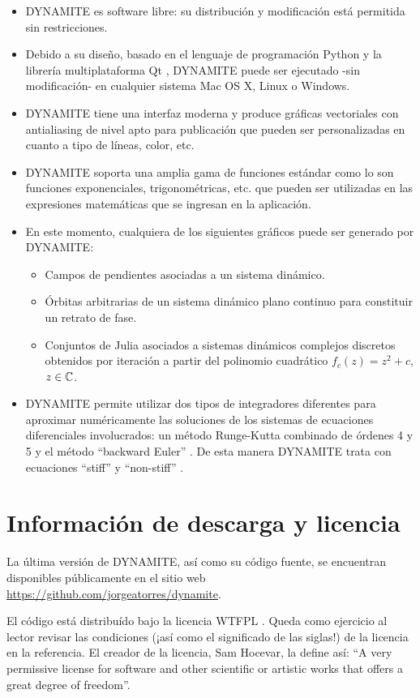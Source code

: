 \begin{itemize}
	\item DYNAMITE es software libre: su distribución y modificación está permitida sin restricciones.
	\item Debido a su diseño, basado en el lenguaje de programación Python \cite{python} y la librería multiplataforma Qt \cite{libqt}, DYNAMITE puede ser ejecutado -sin modificación- en cualquier sistema Mac OS X, Linux o Windows.
	\item DYNAMITE tiene una interfaz moderna y produce gráficas vectoriales con antialiasing \cite{pcmagantialiasing} de nivel apto para publicación que pueden ser personalizadas en cuanto a tipo de líneas, color, etc.
	\item DYNAMITE soporta una amplia gama de funciones estándar como lo son funciones exponenciales, trigonométricas, etc. que pueden ser utilizadas en las expresiones matemáticas que se ingresan en la aplicación.
	\item En este momento, cualquiera de los siguientes gráficos puede ser generado por DYNAMITE:
		\begin{itemize}
			\item Campos de pendientes asociadas a un sistema dinámico.
			\item Órbitas arbitrarias de un sistema dinámico plano continuo para constituir un retrato de fase.
			\item Conjuntos de Julia \cites{complexdynamics,milnorcomplex} asociados a sistemas dinámicos complejos discretos obtenidos por iteración a partir del polinomio cuadrático $f_c(z) = z^2 + c$, $z \in {\ensuremath{\mathbb{C}}}$.
		\end{itemize}
	\item DYNAMITE permite utilizar dos tipos de integradores diferentes para aproximar numéricamente las soluciones de los sistemas de ecuaciones diferenciales involucrados: un método Runge-Kutta combinado de órdenes 4 y 5 \cites[p.~518]{analisisnumerico}{fehlberg} y el método ``backward Euler'' \cites[p.~584]{analisisnumerico}{butcher}. De esta manera DYNAMITE  trata con ecuaciones ``stiff'' \cites{stiff}[p.~583]{analisisnumerico} y ``non-stiff'' \cite{nonstiff}.
\end{itemize}

\section{Información de descarga y licencia}

La última versión de DYNAMITE, así como su código fuente, se encuentran disponibles públicamente en el sitio web \url{https://github.com/jorgeatorres/dynamite}.

El código está distribuído bajo la licencia WTFPL \cite{wtfpl}. Queda como ejercicio al lector revisar las condiciones (¡así como el significado de las siglas!) de la licencia en la referencia. El creador de la licencia, Sam Hocevar, la define así: ``A very permissive license for software and other scientific or artistic works that offers a great degree of freedom''.